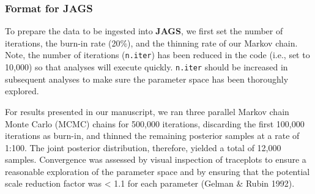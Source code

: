 \documentclass[]{article}
\newenvironment{Shaded}{\begin{snugshade}}{\end{snugshade}}
\newcommand{\CommentTok}[1]{\textcolor[rgb]{0.56,0.35,0.01}{\textit{#1}}}
\newcommand{\DataTypeTok}[1]{\textcolor[rgb]{0.13,0.29,0.53}{#1}}
\newcommand{\DecValTok}[1]{\textcolor[rgb]{0.00,0.00,0.81}{#1}}
\newcommand{\KeywordTok}[1]{\textcolor[rgb]{0.13,0.29,0.53}{\textbf{#1}}}
\newcommand{\NormalTok}[1]{#1}
\newcommand{\OperatorTok}[1]{\textcolor[rgb]{0.81,0.36,0.00}{\textbf{#1}}}
\newcommand{\StringTok}[1]{\textcolor[rgb]{0.31,0.60,0.02}{#1}}
\begin{document}
\begin{Shaded}
\end{Shaded}

\hypertarget{format-for-jags}{%
\subsubsection{Format for JAGS}\label{format-for-jags}}

To prepare the data to be ingested into \textbf{JAGS}, we first set the
number of iterations, the burn-in rate (20\%), and the thinning rate of
our Markov chain. Note, the number of iterations (\texttt{n.iter}) has
been reduced in the code (i.e., set to 10,000) so that analyses will
execute quickly. \texttt{n.iter} should be increased in subsequent
analyses to make sure the parameter space has been thoroughly explored.

For results presented in our manuscript, we ran three parallel Markov
chain Monte Carlo (MCMC) chains for 500,000 iterations, discarding the
first 100,000 iterations as burn-in, and thinned the remaining posterior
samples at a rate of 1:100. The joint posterior distribution, therefore,
yielded a total of 12,000 samples. Convergence was assessed by visual
inspection of traceplots to ensure a reasonable exploration of the
parameter space and by ensuring that the potential scale reduction
factor was \textless{} 1.1 for each parameter (Gelman \& Rubin 1992).
\end{document}
